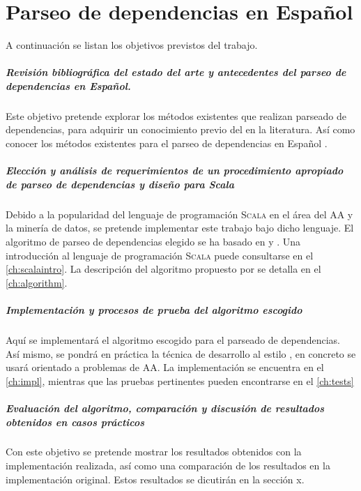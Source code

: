 \chapter{Parseo de dependencias en Español}\label{ch:goals}

A continuación se listan los objetivos previstos del trabajo.

\paragraph{Revisión bibliográfica del estado del arte y antecedentes del parseo
  de dependencias en Español.} Este objetivo pretende explorar los métodos
existentes que realizan parseado de dependencias, para adquirir un conocimiento
previo del  en la literatura. Así como conocer los
métodos existentes para el parseo de dependencias en Español
\cite{ballesteros2016}.

\paragraph{Elección y análisis de requerimientos de un procedimiento apropiado de
  parseo de dependencias y diseño para Scala}
Debido a la popularidad del lenguaje de programación \textsc{Scala} en el área
del \ac{AA} y la minería de datos, se pretende implementar este trabajo bajo
dicho lenguaje. El algoritmo de parseo de dependencias elegido se ha basado en
\citeauthor{yamada2003} \cite{yamada2003} y \citeauthor{rohit2016}
\cite{rohit2016}. Una introducción al lenguaje de programación \textsc{Scala}
puede consultarse en el \autoref{ch:scalaintro}. La descripción del algoritmo
propuesto por \citeauthor{yamada2003} se detalla en el \autoref{ch:algorithm}.

\paragraph{Implementación y procesos de prueba del algoritmo escogido}
Aquí se implementará el algoritmo escogido para el parseado de dependencias. Así
mismo, se pondrá en práctica la técnica de desarrollo al estilo
, en concreto se usará  orientado a
problemas de \ac{AA}. La implementación se encuentra en el \autoref{ch:impl},
mientras que las pruebas pertinentes pueden encontrarse en el \autoref{ch:tests}

\paragraph{Evaluación del algoritmo, comparación y discusión de resultados
  obtenidos en casos prácticos}
Con este objetivo se pretende mostrar los resultados obtenidos con la
implementación realizada, así como una comparación de los resultados en la
implementación original. Estos resultados se dicutirán en la sección x.

